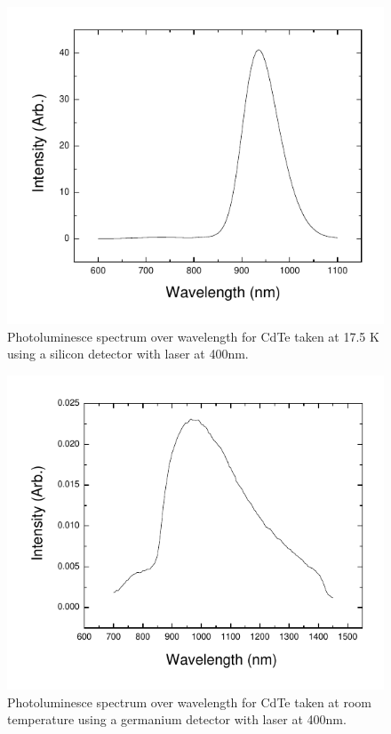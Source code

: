 \documentclass[oneside]{BYUPhys}
\begin{document}
\begin{appendices}
\begin{figure}
    \centerline{\includegraphics{cdte-pl-lowtemp}}
    \caption[Photoluminesce spectrum for CdTe at 17.5 K]{\label{fig:CdTeLowTemp}
     Photoluminesce spectrum over wavelength for CdTe taken at 17.5 K using a silicon detector with laser at 400nm.}
 \end{figure}

\begin{figure}
    \centerline{\includegraphics{cdte-pl-hightemp}}
    \caption[Photoluminesce spectrum for CdTe at room temperature]{\label{fig:CdTeHighTemp}
     Photoluminesce spectrum over wavelength for CdTe taken at room temperature using a germanium detector with laser at 400nm.}
 \end{figure}

\end{appendices}




\printindex
\end{document}
